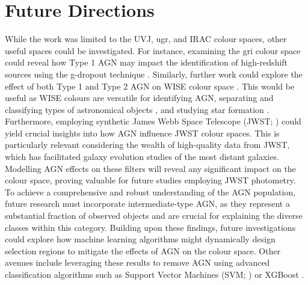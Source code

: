 \section{Future Directions}
While the work was limited to the UVJ, ugr, and IRAC colour spaces, other useful spaces could be investigated. For instance, examining the gri colour space could reveal how Type 1 AGN may impact the identification of high-redshift sources using the g-dropout technique \citep{giavalisco_lyman-break_2002}. Similarly, further work could explore the effect of both Type 1 and Type 2 AGN on WISE colour space \citep{wright_wide-field_2010}. This would be useful as WISE colours are versatile for identifying AGN, separating and classifying types of astronomical objects \citep{krakowski_machine-learning_2016}, and studying star formation \citep{caccianiga_wise_2015}.
Furthermore, employing synthetic James Webb Space Telescope (JWST; \citealt{gardner_james_2006}) could yield crucial insights into how AGN influence JWST colour spaces. This is particularly relevant considering the wealth of high-quality data from JWST, which has facilitated galaxy evolution studies of the most distant galaxies. Modelling AGN effects on these filters will reveal any significant impact on the colour space, proving valuable for future studies employing JWST photometry. To achieve a comprehensive and robust understanding of the AGN population, future research must incorporate intermediate-type AGN, as they represent a substantial fraction of observed objects and are crucial for explaining the diverse classes within this category. Building upon these findings, future investigations could explore how machine learning algorithms might dynamically design selection regions to mitigate the effects of AGN on the colour space.  Other avenues include leveraging these results to remove AGN using advanced classification algorithms such as Support Vector Machines (SVM; \citealt{hearst_support_1998}) or XGBoost \citep{chen_xgboost_2016}.

